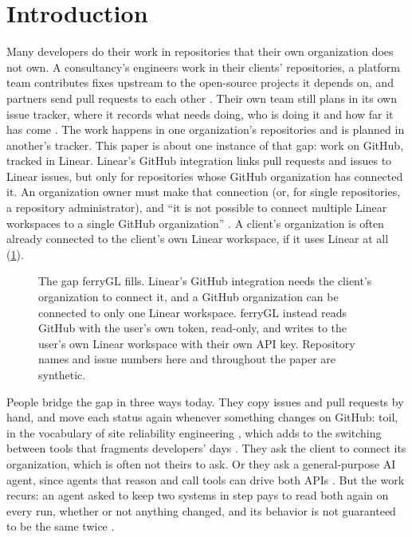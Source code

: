 \documentclass[11pt,a4paper]{article}
\newcommand{\ferry}{ferryGL}
\begin{document}
\section{Introduction}
\label{sec:introduction}

Many developers do their work in repositories that their own organization does not own. A
consultancy's engineers work in their clients' repositories, a platform team contributes fixes
upstream to the open-source projects it depends on, and partners send pull requests to each
other \cite{gousios2014exploratory, gousios2016work}. Their own team still plans in its own
issue tracker, where it records what needs doing, who is doing it and how far it has come
\cite{bertram2010communication}. The work happens in one organization's repositories and is
planned in another's tracker. This paper is about one instance of that gap: work on GitHub,
tracked in Linear. Linear's GitHub integration links pull requests and issues to Linear issues,
but only for repositories whose GitHub organization has connected it. An organization owner
must make that connection (or, for single repositories, a repository administrator), and
\enquote{it is not possible to connect multiple Linear workspaces to a single GitHub
organization} \cite{linear2026github}. A client's organization is often already connected to
the client's own Linear workspace, if it uses Linear at all (\cref{fig:gap}).

\begin{figure}[t]
  \centering
  
  \caption{The gap \ferry{} fills. Linear's GitHub integration needs the client's
    organization to connect it, and a GitHub organization can be connected to only one Linear
    workspace. \ferry{} instead reads GitHub with the user's own token, read-only, and writes
    to the user's own Linear workspace with their own API key. Repository names and issue
    numbers here and throughout the paper are synthetic.}
  \label{fig:gap}
\end{figure}

People bridge the gap in three ways today. They copy issues and pull requests by hand, and
move each status again whenever something changes on GitHub: toil, in the vocabulary of site
reliability engineering \cite{rau2016eliminating}, which adds to the switching between tools
that fragments developers' days \cite{meyer2017work}. They ask the client to connect its
organization, which is often not theirs to ask. Or they ask a general-purpose AI agent, since agents that reason and call tools can drive both APIs \cite{yao2023react,
yang2024sweagent}. But the work recurs: an agent asked to keep two systems in step pays to read
both again on every run, whether or not anything changed, and its behavior is not guaranteed to
be the same twice \cite{ouyang2025empirical, atil2025nondeterminism}.
\end{document}
